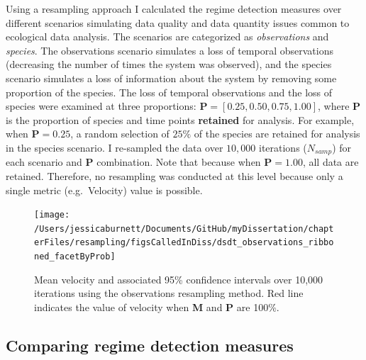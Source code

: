 \documentclass[12pt,twoside,openany]{reedthesis}
\begin{document}
Using a resampling approach I calculated the regime detection measures over different scenarios simulating data quality and data quantity issues common to ecological data analysis. The scenarios are categorized as \emph{observations} and \emph{species}. The observations scenario simulates a loss of temporal observations (decreasing the number of times the system was observed), and the species scenario simulates a loss of information about the system by removing some proportion of the species. The loss of temporal observations and the loss of species were examined at three proportions: \(\textbf{P} = [0.25, 0.50, 0.75, 1.00]\), where \(\textbf{P}\) is the proportion of species and time points \textbf{retained} for analysis. For example, when \(\textbf{P} = 0.25\), a random selection of \(25\%\) of the species are retained for analysis in the species scenario. I re-sampled the data over \(10,000\) iterations (\(N_{samp}\)) for each scenario and \(\textbf{P}\) combination. Note that because when \(\textbf{P} = 1.00\), all data are retained. Therefore, no resampling was conducted at this level because only a single metric (e.g.~Velocity) value is possible.

\begin{figure}
\texttt{[image: /Users/jessicaburnett/Documents/GitHub/myDissertation/chapterFiles/resampling/figsCalledInDiss/dsdt\_observations\_ribboned\_facetByProb]} \caption{Mean velocity and associated 95\% confidence intervals over 10,000 iterations using the observations resampling method. Red line indicates the value of velocity when \textbf{M} and \textbf{P} are 100\%.}\label{fig:dsdtResamp}
\end{figure}
\hypertarget{comparing-regime-detection-measures}{%
\subsection{Comparing regime detection measures}\label{comparing-regime-detection-measures}}
\end{document}
